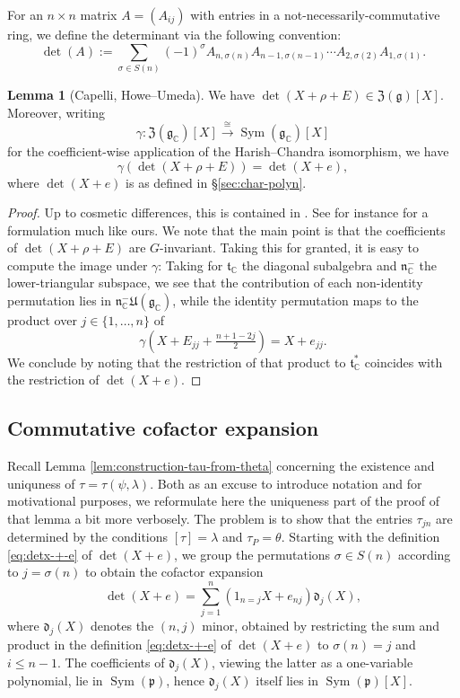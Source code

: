 \documentclass[reqno]{amsart}
\DeclareMathOperator{\Sym}{Sym}
\theoremstyle{plain} \newtheorem{theorem} {Theorem}
\theoremstyle{definition} \newtheorem{definition} [theorem] {Definition}
\theoremstyle{itplain} %
\newtheorem{lemma}[theorem]{Lemma}
\numberwithin{equation}{section}
\numberwithin{theorem}{section}
\renewcommand{\leq}{\leqslant}
\begin{document}
For an $n \times n$ matrix $A = (A_{i j})$ with entries in a not-necessarily-commutative ring, we define the determinant via the following convention:
\[
  \det(A) := \sum _{\sigma \in S(n)} (-1)^\sigma A_{n,\sigma(n)} A_{n-1,\sigma(n-1)} \dotsb A_{2,\sigma(2)} A_{1,\sigma(1)}.
\]
\begin{lemma}[Capelli, Howe--Umeda]
  We have $\det(X + \rho + E) \in \mathfrak{Z}(\mathfrak{g})[X]$.  Moreover, writing
  \[
    \gamma : \mathfrak{Z}(\mathfrak{g}_\mathbb{C})[X] \xrightarrow{\cong } \Sym(\mathfrak{g}_\mathbb{C})[X]
  \]
  for the coefficient-wise application of the Harish--Chandra isomorphism, we have
  \[
    \gamma(\det(X + \rho + E)) = \det(X + e),
  \]
  where $\det(X + e)$ is as defined in \S\ref{sec:char-polyn}.
\end{lemma}
\begin{proof}
  Up to cosmetic differences, this is contained in \cite{MR1116239}.  See for instance \cite[\S4.1]{MR2035111} for a formulation much like ours.  We note that the main point is that the coefficients of $\det(X + \rho + E)$ are $G$-invariant.  Taking this for granted, it is easy to compute the image under $\gamma$: Taking for $\mathfrak{t}_\mathbb{C}$ the diagonal subalgebra and $\mathfrak{n}_{\mathbb{C}}^{-}$ the lower-triangular subspace, we see that the contribution of each non-identity permutation lies in $\mathfrak{n}_\mathbb{C}^- \mathfrak{U}(\mathfrak{g}_\mathbb{C})$, while the identity permutation maps to the product over $j \in \{1, \dotsc, n\}$ of
  \[
    \gamma (X + E_{j j} + \tfrac{n +1 - 2 j}{2}) = X + e_{j j}.
  \]
  We conclude by noting that the restriction of that product to $\mathfrak{t}_\mathbb{C}^*$ coincides with the restriction of $\det(X+e)$.
\end{proof}

\subsection{Commutative cofactor expansion}\label{sec:comm-cofact-expans}
Recall Lemma \ref{lem:construction-tau-from-theta} concerning the existence and uniquness of $\tau = \tau(\psi,\lambda)$.  Both as an excuse to introduce notation and for motivational purposes, we reformulate here the uniqueness part of the proof of that lemma a bit more verbosely.  The problem is to show that the entries $\tau_{j n}$ are determined by the conditions $[\tau] = \lambda$ and $\tau_P = \theta$.  Starting with the definition \eqref{eq:detx-+-e} of $\det(X + e)$, we group the permutations $\sigma \in S(n)$ according to $j = \sigma(n)$ to obtain the cofactor expansion
\begin{equation}\label{eq:detx-+-e-1}
  \det(X + e) = \sum _{j = 1}^n ( 1_{n=j} X + e_{n j} ) \mathfrak{d}_j(X),
\end{equation}
where $\mathfrak{d}_j(X)$ denotes the $(n,j)$ minor, obtained by restricting the sum and product in the definition \eqref{eq:detx-+-e} of $\det(X+e)$ to $\sigma(n) = j$ and $i \leq n-1$.  The coefficients of $\mathfrak{d}_j(X)$, viewing the latter as a one-variable polynomial, lie in $\Sym(\mathfrak{p})$, hence $\mathfrak{d}_j(X)$ itself lies in $\Sym(\mathfrak{p})[X]$.
\end{document}

